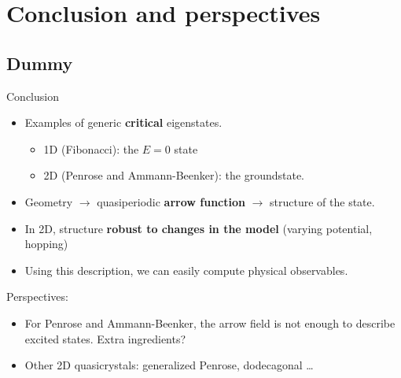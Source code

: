 \documentclass[xcolor=x11names,compress,professionalfonts, aspectratio=169]{beamer}
\renewcommand{\(}{\begin{columns}}
\renewcommand{\)}{\end{columns}}
\newcommand{\<}[1]{\begin{column}{#1}}
\renewcommand{\>}{\end{column}}
\begin{document}
\section{Conclusion and perspectives}
\subsection{Dummy}
\begin{frame}{Conclusion}
\begin{itemize}
	\item Examples of generic \textbf{critical} eigenstates.
	\begin{itemize}
		\item 1D (Fibonacci): the $E=0$ state
		\item 2D (Penrose and Ammann-Beenker): the groundstate.
	\end{itemize}
	\item Geometry $\rightarrow$ quasiperiodic \textbf{arrow function} $\rightarrow$ structure of the state.
	\item In 2D, structure \textbf{robust to changes in the model} (varying potential, hopping)
	\item Using this description, we can easily compute physical observables.
\end{itemize}
Perspectives:
\begin{itemize}
	\item For Penrose and Ammann-Beenker, the arrow field is not enough to describe excited states. Extra ingredients?
	\item Other 2D quasicrystals: generalized Penrose, dodecagonal \dots
\end{itemize}
\end{frame}
\end{document}

